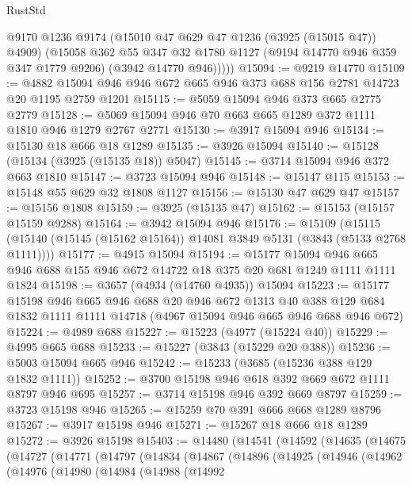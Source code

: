 \begin{lexlean}{RustStd}
\begin{coremodule}
          @9170
          @1236
          @9174
          (@15010 @47 @629 @47 @1236 (@3925 (@15015 @47)) @4909)
          (@15058
            @362
            @55
            @347
            @32
            @1780
            @1127
            (@9194 @14770 @946 @359 @347 @1779 @9206)
            (@3942 @14770 @946)))))
@15094 := @9219 @14770
@15109 := @4882 @15094 @946 @946 @672 @665 @946 @373 @688 @156 @2781 @14723 @20 @1195 @2759 @1201
@15115 := @5059 @15094 @946 @373 @665 @2775 @2779
@15128 := @5069 @15094 @946 @70 @663 @665 @1289 @372 @1111 @1810 @946 @1279 @2767 @2771
@15130 := @3917 @15094 @946
@15134 := @15130 @18 @666 @18 @1289
@15135 := @3926 @15094
@15140 := @15128 (@15134 (@3925 (@15135 @18)) @5047)
@15145 := @3714 @15094 @946 @372 @663 @1810
@15147 := @3723 @15094 @946
@15148 := @15147 @115
@15153 := @15148 @55 @629 @32 @1808 @1127
@15156 := @15130 @47 @629 @47
@15157 := @15156 @1808
@15159 := @3925 (@15135 @47)
@15162 := @15153 (@15157 @15159 @9288)
@15164 := @3942 @15094 @946
@15176 := @15109
    (@15115 (@15140 (@15145 (@15162 @15164)) @14081 @3849 @5131 (@3843 (@5133 @2768 @1111))))
@15177 := @4915 @15094
@15194 := @15177
    @15094
    @946
    @665
    @946
    @688
    @155
    @946
    @672
    @14722
    @18
    @375
    @20
    @681
    @1249
    @1111
    @1111
    @1824
@15198 := @3657 (@4934 (@14760 @4935)) @15094
@15223 := @15177
    @15198
    @946
    @665
    @946
    @688
    @20
    @946
    @672
    @1313
    @40
    @388
    @129
    @684
    @1832
    @1111
    @1111
    @14718
    (@4967 @15094 @946 @665 @946 @688 @946 @672)
@15224 := @4989 @688
@15227 := @15223 (@4977 (@15224 @40))
@15229 := @4995 @665 @688
@15233 := @15227 (@3843 (@15229 @20 @388))
@15236 := @5003 @15094 @665 @946
@15242 := @15233 (@3685 (@15236 @388 @129 @1832 @1111))
@15252 := @3700 @15198 @946 @618 @392 @669 @672 @1111 @8797 @946 @695
@15257 := @3714 @15198 @946 @392 @669 @8797
@15259 := @3723 @15198 @946
@15265 := @15259 @70 @391 @666 @668 @1289 @8796
@15267 := @3917 @15198 @946
@15271 := @15267 @18 @666 @18 @1289
@15272 := @3926 @15198
@15403 := @14480
    (@14541
      (@14592
        (@14635
          (@14675
            (@14727
              (@14771
                (@14797
                  (@14834
                    (@14867
                      (@14896
                        (@14925
                          (@14946
                            (@14962
                              (@14976
                                (@14980
                                  (@14984
                                    (@14988
                                      (@14992

\end{coremodule}
\end{lexlean}
